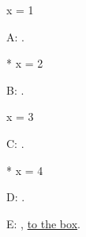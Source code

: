 \documentclass{article}
\newcounter{demo}
\begin{document}
\begin{grab}[{a]b}]
x = 1
\end{grab}
A: \seen.

\begin{grab}*
x = 2
\end{grab}
B: \seen.

\begin{bang}
x = 3
\end{bang}
C: \seen.

\begin{lead}*
x = 4
\end{lead}
D: \seen.

\begin{tgt}[boxe]
\end{tgt}
E: \thedemo, \hyperlink{boxe}{to the box}.
\end{document}
